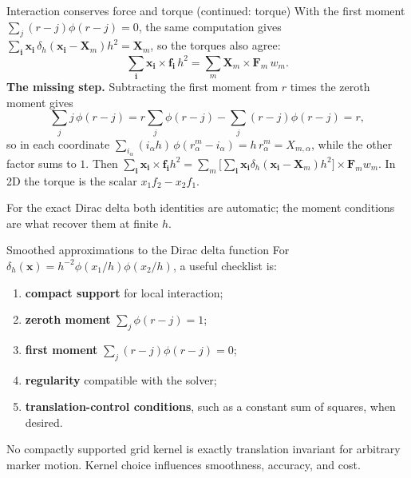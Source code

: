 \documentclass[aspectratio=169,11pt]{beamer}
\newcommand{\xvec}{\bm{x}}
\newcommand{\Xvec}{\bm{X}}
\newcommand{\fvec}{\bm{f}}
\newcommand{\Fvec}{\bm{F}}
\newcommand{\ivec}{\bm{i}}
\begin{document}
\begin{frame}{Interaction conserves force and torque (continued: torque)}
With the first moment \(\sum_j(r-j)\phi(r-j)=0\), the same computation gives \(\sum_{\ivec}\xvec_{\ivec}\,\delta_h(\xvec_{\ivec}-\Xvec_m)h^2=\Xvec_m\), so the torques also agree:
\[
  \sum_{\ivec}\xvec_{\ivec}\times\fvec_{\ivec}\,h^2
  =
  \sum_m\Xvec_m\times\Fvec_m\,w_m .
\]
\textbf{The missing step.} Subtracting the first moment from \(r\) times the zeroth moment gives
\[
  \sum_{j}j\,\phi(r-j)=r\sum_j\phi(r-j)-\sum_j(r-j)\phi(r-j)=r ,
\]
so in each coordinate \(\sum_{i_\alpha}(i_\alpha h)\,\phi(r^m_\alpha-i_\alpha)=h\,r^m_\alpha=X_{m,\alpha}\), while the other factor sums to \(1\). Then
\(\sum_{\ivec}\xvec_{\ivec}\times\fvec_{\ivec}h^2=\sum_m\bigl[\sum_{\ivec}\xvec_{\ivec}\delta_h(\xvec_{\ivec}-\Xvec_m)h^2\bigr]\times\Fvec_m w_m\).
In 2D the torque is the scalar \(x_1f_2-x_2f_1\). 
\begin{punchbox}
\small For the exact Dirac delta both identities are automatic; the moment conditions are what recover them at finite \(h\).
\end{punchbox}
\end{frame}

\begin{frame}{Smoothed approximations to the Dirac delta function}
\small
For \(\delta_h(\xvec)=h^{-2}\phi(x_1/h)\phi(x_2/h)\), a useful checklist is:
\begin{enumerate}\itemsep6pt
  \item \textbf{compact support} for local interaction;
  \item \textbf{zeroth moment} \(\sum_j\phi(r-j)=1\);
  \item \textbf{first moment} \(\sum_j(r-j)\phi(r-j)=0\);
  \item \textbf{regularity} compatible with the solver;
  \item \textbf{translation-control conditions}, such as a constant sum of squares, when desired.
\end{enumerate}
\begin{punchbox}
\small No compactly supported grid kernel is exactly translation invariant for arbitrary marker motion. Kernel choice influences smoothness, accuracy, and cost.
\end{punchbox}
\end{frame}
\end{document}
